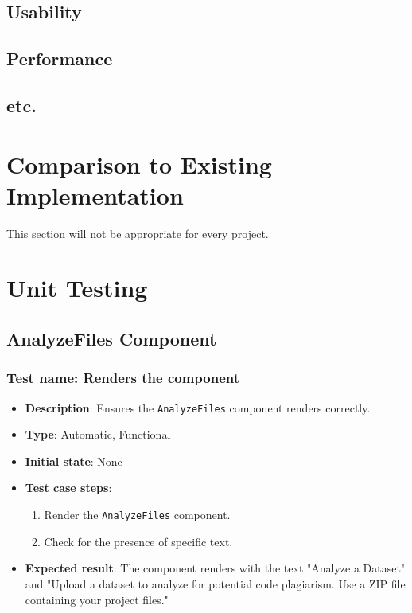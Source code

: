 \documentclass[12pt, titlepage]{article}
\begin{document}
\subsection{Usability}
		
\subsection{Performance}

\subsection{etc.}
	
\section{Comparison to Existing Implementation}	

This section will not be appropriate for every project.

\section{Unit Testing}
\subsection{AnalyzeFiles Component}

\subsubsection{Test name: Renders the component}
\begin{itemize}
    \item \textbf{Description}: Ensures the \texttt{AnalyzeFiles} component renders correctly.
    \item \textbf{Type}: Automatic, Functional
    \item \textbf{Initial state}: None
    \item \textbf{Test case steps}:
    \begin{enumerate}
        \item Render the \texttt{AnalyzeFiles} component.
        \item Check for the presence of specific text.
    \end{enumerate}
    \item \textbf{Expected result}: The component renders with the text "Analyze a Dataset" and "Upload a dataset to analyze for potential code plagiarism. Use a ZIP file containing your project files."
\end{itemize}
\end{document}
